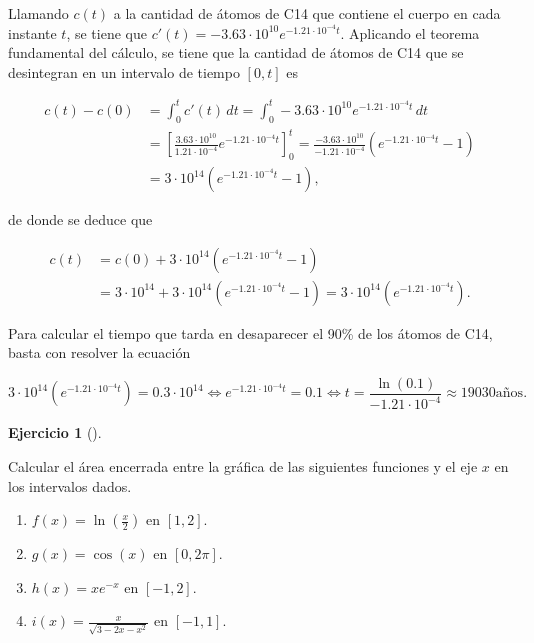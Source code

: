 \documentclass[
  spanish,
  a4paper,
]{scrreport}
\theoremstyle{definition}
\newtheorem{exercise}{Ejercicio}[chapter]
\theoremstyle{remark}
\begin{document}
\begin{tcolorbox}[enhanced jigsaw, arc=.35mm, bottomrule=.15mm, bottomtitle=1mm, breakable, colback=white, colbacktitle=quarto-callout-tip-color!10!white, colframe=quarto-callout-tip-color-frame, coltitle=black, left=2mm, leftrule=.75mm, opacityback=0, opacitybacktitle=0.6, rightrule=.15mm, title=\textcolor{quarto-callout-tip-color}{\faLightbulb}\hspace{0.5em}{Solución}, titlerule=0mm, toprule=.15mm, toptitle=1mm]

Llamando \(c(t)\) a la cantidad de átomos de C14 que contiene el cuerpo
en cada instante \(t\), se tiene que
\(c'(t) = -3.63\cdot 10^{10}e^{-1.21\cdot 10^{-4}t}\). Aplicando el
teorema fundamental del cálculo, se tiene que la cantidad de átomos de
C14 que se desintegran en un intervalo de tiempo \([0,t]\) es

\begin{align*}
c(t) - c(0) 
&= \int_0^t c'(t)\,dt
= \int_0^t -3.63\cdot 10^{10}e^{-1.21\cdot 10^{-4}t}\,dt \\
&= [\frac{3.63\cdot 10^{10}}{1.21\cdot 10^{-4}}e^{-1.21\cdot 10^{-4}t}]_0^t
= \frac{-3.63\cdot 10^{10}}{-1.21\cdot 10^{-4}}(e^{-1.21\cdot 10^{-4}t}-1) \\
&= 3\cdot 10^{14}(e^{-1.21\cdot 10^{-4}t}-1),
\end{align*}

de donde se deduce que

\begin{align*}
c(t) 
&= c(0) + 3\cdot 10^{14}(e^{-1.21\cdot 10^{-4}t}-1) \\
&= 3\cdot 10^{14} + 3\cdot 10^{14}(e^{-1.21\cdot 10^{-4}t}-1)
= 3\cdot 10^{14}(e^{-1.21\cdot 10^{-4}t}).
\end{align*}

Para calcular el tiempo que tarda en desaparecer el 90\% de los átomos
de C14, basta con resolver la ecuación

\[
3\cdot 10^{14}(e^{-1.21\cdot 10^{-4}t}) = 0.3\cdot 10^{14}
\Leftrightarrow e^{-1.21\cdot 10^{-4}t} = 0.1
\Leftrightarrow t = \frac{\ln(0.1)}{-1.21\cdot 10^{-4}} \approx 19030 \mbox{años.}
\]

\end{tcolorbox}

\begin{exercise}[]\protect\hypertarget{exr-areas-1}{}\label{exr-areas-1}

Calcular el área encerrada entre la gráfica de las siguientes funciones
y el eje \(x\) en los intervalos dados.

\begin{enumerate}
\def\labelenumi{\alph{enumi}.}
\item
  \(f(x) = \ln\left(\frac{x}{2}\right)\) en \([1,2]\).
\item
  \(g(x) = \cos(x)\) en \([0,2\pi]\).
\item
  \(h(x) = xe^{-x}\) en \([-1,2]\).
\item
  \(i(x) = \frac{x}{\sqrt{3-2x-x^2}}\) en \([-1,1]\).
\end{enumerate}

\end{exercise}
\end{document}
